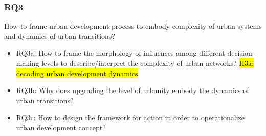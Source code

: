 \documentclass[11pt]{report}
\begin{document}
\subsubsection{RQ3}
How to frame urban development process to embody complexity of urban systems and dynamics of urban transitions?
\begin{itemize}
\item RQ3a: How to frame the morphology of influences among different decision-making levels to describe/interpret the complexity of urban networks?  \hl{H3a: decoding urban development dynamics}
\item RQ3b: Why does upgrading the level of urbanity embody the dynamics of urban transitions?
\item RQ3c: How to design the framework for action in order to operationalize urban development concept?
\end {itemize}
\end{document}
